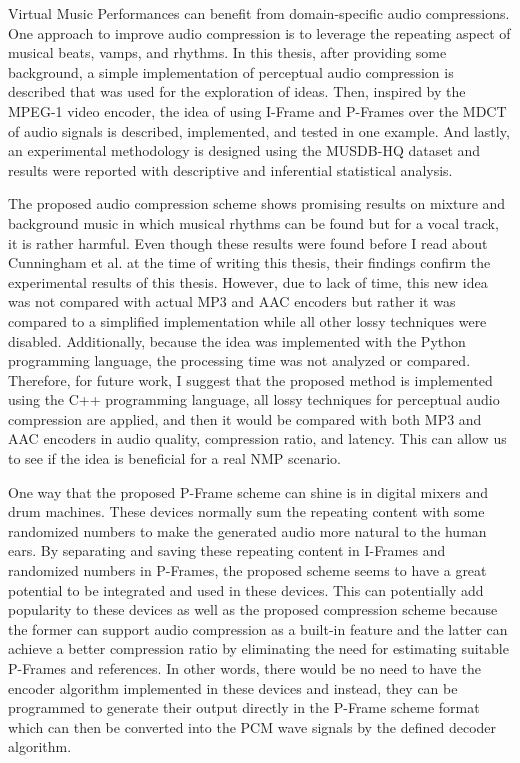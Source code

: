 \label{chapter:concl}

Virtual Music Performances can benefit from domain-specific audio compressions. One approach to improve audio compression is to leverage the repeating aspect of musical beats, vamps, and rhythms. In this thesis, after providing some background, a simple implementation of perceptual audio compression is described that was used for the exploration of ideas. Then, inspired by the MPEG-1 video encoder, the idea of using I-Frame and P-Frames over the MDCT of audio signals is described, implemented, and tested in one example. And lastly, an experimental methodology is designed using the MUSDB-HQ dataset and results were reported with descriptive and inferential statistical analysis.

The proposed audio compression scheme shows promising results on mixture and background music in which musical rhythms can be found but for a vocal track, it is rather harmful. Even though these results were found before I read about Cunningham et al. at the time of writing this thesis, their findings confirm the experimental results of this thesis. However, due to lack of time, this new idea was not compared with actual MP3 and AAC encoders but rather it was compared to a simplified implementation while all other lossy techniques were disabled. Additionally, because the idea was implemented with the Python programming language, the processing time was not analyzed or compared. Therefore, for future work, I suggest that the proposed method is implemented using the C++ programming language, all lossy techniques for perceptual audio compression are applied, and then it would be compared with both MP3 and AAC encoders in audio quality, compression ratio, and latency. This can allow us to see if the idea is beneficial for a real NMP scenario.

One way that the proposed P-Frame scheme can shine is in digital mixers and drum machines. These devices normally sum the repeating content with some randomized numbers to make the generated audio more natural to the human ears. By separating and saving these repeating content in I-Frames and randomized numbers in P-Frames, the proposed scheme seems to have a great potential to be integrated and used in these devices. This can potentially add popularity to these devices as well as the proposed compression scheme because the former can support audio compression as a built-in feature and the latter can achieve a better compression ratio by eliminating the need for estimating suitable P-Frames and references. In other words, there would be no need to have the encoder algorithm implemented in these devices and instead, they can be programmed to generate their output directly in the P-Frame scheme format which can then be converted into the PCM wave signals by the defined decoder algorithm.

